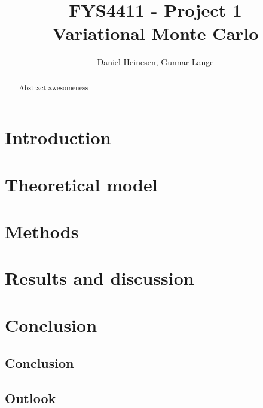 \documentclass[a4paper, 10pt]{article}
\title{FYS4411 - Project 1\\
Variational Monte Carlo}
\author{Daniel Heinesen, Gunnar Lange}
\begin{document}
\maketitle
\begin{abstract}
Abstract awesomeness
\end{abstract}
\tableofcontents
\section{Introduction}
\section{Theoretical model}
\section{Methods}\label{Method_section}
\section{Results and discussion}
\section{Conclusion}
\subsection{Conclusion}

\subsection{Outlook}
\end{document}
